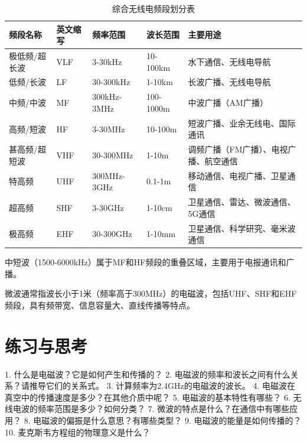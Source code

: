 \documentclass[12pt,UTF8]{ctexbook}
\begin{document}
\begin{table}[htbp]
    \centering
    \begin{threeparttable}
    \small
    \begin{tabular}{|p{2cm}|p{1.2cm}|p{3cm}|p{2cm}|p{4cm}|}
        \hline
        \textbf{频段名称} & \textbf{英文缩写} & \textbf{频率范围} & \textbf{波长范围} & \textbf{主要用途} \\
        \hline
        极低频/超长波 & VLF & 3-30kHz & 10-100km & 水下通信、无线电导航 \\
        \hline
        低频/长波 & LF & 30-300kHz & 1-10km & 长波广播、无线电导航 \\
        \hline
        中频/中波 & MF & 300kHz-3MHz & 100-1000m & 中波广播（AM广播） \\
        \hline
        高频/短波 & HF & 3-30MHz & 10-100m & 短波广播、业余无线电、国际通讯 \\
        \hline
        甚高频/超短波 & VHF & 30-300MHz & 1-10m & 调频广播（FM广播）、电视广播、航空通信 \\
        \hline
        特高频 & UHF & 300MHz-3GHz & 0.1-1m & 移动通信、电视广播、卫星通信 \\
        \hline
        超高频 & SHF & 3-30GHz & 1-10cm & 卫星通信、雷达、微波通信、5G通信 \\
        \hline
        极高频 & EHF & 30-300GHz & 1-10mm & 卫星通信、科学研究、毫米波通信 \\
        \hline
    \end{tabular}
    \caption{综合无线电频段划分表}
    \label{tab:radio_bands_comprehensive}
    \begin{tablenotes}
        \item[注1] 中短波（1500-6000kHz）属于MF和HF频段的重叠区域，主要用于电报通讯和广播。
        \item[注2] 微波通常指波长小于1米（频率高于300MHz）的电磁波，包括UHF、SHF和EHF频段，具有频带宽、信息容量大、直线传播等特点。
    \end{tablenotes}
    \end{threeparttable}
\end{table}

\section{练习与思考}

1. 什么是电磁波？它是如何产生和传播的？
2. 电磁波的频率和波长之间有什么关系？请推导它们的关系式。
3. 计算频率为2.4GHz的电磁波的波长。
4. 电磁波在真空中的传播速度是多少？在其他介质中呢？
5. 电磁波的基本特性有哪些？
6. 无线电波的频率范围是多少？如何分类？
7. 微波的特点是什么？在通信中有哪些应用？
8. 电磁波的偏振是什么意思？有哪些类型？
9. 电磁波的能量是如何传播的？
10. 麦克斯韦方程组的物理意义是什么？
\end{document}

